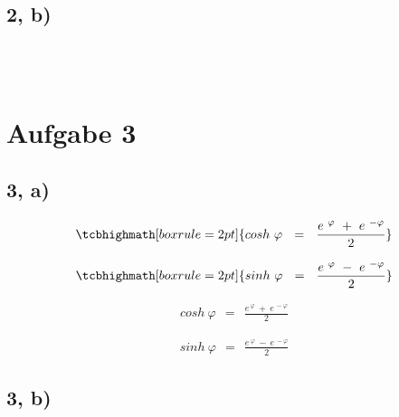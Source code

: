 \subsection*{2, b)}

\hfill




~\\
~\\



\newpage


\section*{Aufgabe 3}

\hfill

\subsection*{3, a)}

\hfill


\[ \tcbhighmath[boxrule=2pt]{ cosh ~ \varphi ~~ = ~~ \frac{ e^{ ~ \varphi} ~ + ~ e^{ ~ -\varphi } }{2} } \]

\[ \tcbhighmath[boxrule=2pt]{ sinh ~ \varphi ~~ = ~~ \frac{ e^{ ~ \varphi} ~ - ~ e^{ ~ -\varphi } }{2} } \]

\hfill

\begin{align*}
	cosh ~ \varphi ~~ = ~~ \frac{ e^{ ~ \varphi} ~ + ~ e^{ ~ -\varphi } }{2}
\end{align*}

\begin{align*}
	sinh ~ \varphi ~~ = ~~ \frac{ e^{ ~ \varphi} ~ - ~ e^{ ~ -\varphi } }{2}
\end{align*}


\newpage


\subsection*{3, b)}

\hfill


\hfill



